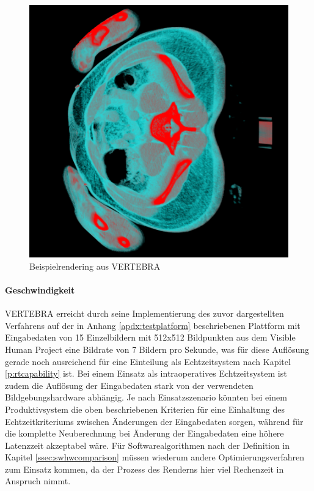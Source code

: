 \documentclass[ngerman,pdftex,paper=A4,DIV=calc,titlepage,12pt]{scrartcl}
\newtheorem[L]{boxedDefinition}{Definition}
\begin{document}
\begin{figure}[p]
\begin{center}
\includegraphics[width=\textwidth]{graphics/vertebra-screenshot-1.png}
\caption{Beispielrendering aus VERTEBRA}
\label{fig:vertebra-screenshot}
\end{center}
\end{figure}\label{ssec:implementations}

\paragraph{Geschwindigkeit}
VERTEBRA erreicht durch seine Implementierung des zuvor dargestellten Verfahrens auf der in Anhang \vref{apdx:testplatform} beschriebenen Plattform mit Eingabedaten von 15 Einzelbildern mit 512x512 Bildpunkten aus dem Visible Human Project eine Bildrate von 7 Bildern pro Sekunde, was für diese Auflösung gerade noch ausreichend für eine Einteilung als Echtzeitsystem nach Kapitel \vref{p:rtcapability} ist. Bei einem Einsatz als intraoperatives Echtzeitsystem ist zudem die Auflösung der Eingabedaten stark von der verwendeten Bildgebungshardware abhängig. Je nach Einsatzszenario könnten bei einem Produktivsystem die oben beschriebenen Kriterien für eine Einhaltung des Echtzeitkriteriums zwischen Änderungen der Eingabedaten sorgen, während für die komplette Neuberechnung bei Änderung der Eingabedaten eine höhere Latenzzeit akzeptabel wäre. Für Softwarealgorithmen nach der Definition in Kapitel \ref{ssec:swhwcomparison} müssen wiederum andere Optimierungsverfahren zum Einsatz kommen, da der Prozess des Renderns hier viel Rechenzeit in Anspruch nimmt.
\end{document}
